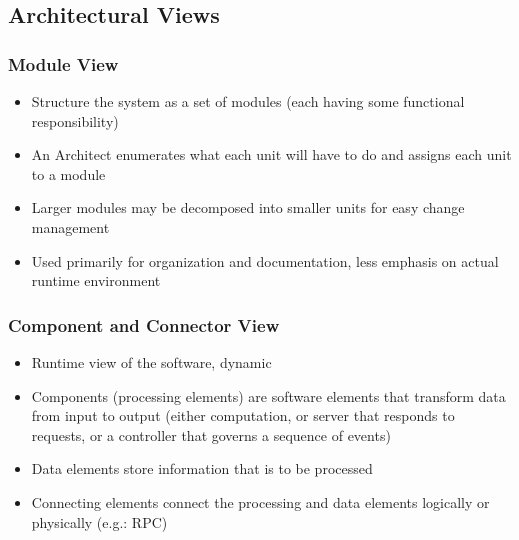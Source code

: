 \documentclass{article}
\begin{document}
\subsection{Architectural Views}
\subsubsection{Module View}
\begin{itemize}
    \item Structure the system as a set of modules (each having some functional responsibility)
    
    \item An Architect enumerates what each unit will have to do and assigns each unit to a module
    
    \item Larger modules may be decomposed into smaller units for easy change management
    
    \item Used primarily for organization and documentation, less emphasis on actual runtime environment
\end{itemize}

\subsubsection{Component and Connector View}
\begin{itemize}
    \item Runtime view of the software, dynamic
    
    \item Components (processing elements) are software elements that transform data from input to output (either computation, or server that responds to requests, or a controller that governs a sequence of events)
    
    \item Data elements store information that is to be processed
    
    \item Connecting elements connect the processing and data elements logically or physically (e.g.: RPC)
\end{itemize}
\end{document}
